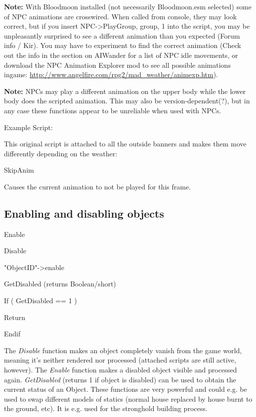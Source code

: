 \textbf{Note:} With Bloodmoon installed (not necessarily Bloodmoon.esm
selected) some of NPC animations are crosswired. When called from
console, they may look correct, but if you insert
NPC-\textgreater PlayGroup, group, 1 into the script, you may be
unpleasantly surprised to see a different animation than you expected
(Forum info / Kir). You may have to experiment to find the correct
animation (Check out the info in the section on AIWander for a list of
NPC idle movements, or download the NPC Animation Explorer mod to see
all possible animations ingame:
\url{http://www.angelfire.com/rpg2/mad_weather/animexp.htm}).

\textbf{Note:} NPCs may play a different animation on the upper body
while the lower body does the scripted animation. This may also be
version-dependent(?), but in any case these functions appear to be
unreliable when used with NPCs.

Example Script:

This original script is attached to all the outside banners and makes
them move differently depending on the weather:



SkipAnim

Causes the current animation to not be played for this frame.

\hypertarget{enabling-and-disabling-objects}{%
\subsection{Enabling and disabling
objects}\label{enabling-and-disabling-objects}}

Enable

Disable

"ObjectID"-\textgreater enable

GetDisabled (returns Boolean/short)

If ( GetDisabled == 1 )

Return

Endif

The \emph{Disable} function makes an object completely vanish from the
game world, meaning it's neither rendered nor processed (attached
scripts are still active, however). The \emph{Enable} function makes a
disabled object visible and processed again. \emph{GetDisabled} (returns
1 if object is disabled) can be used to obtain the current status of an
Object. These functions are very powerful and could e.g. be used to swap
different models of statics (normal house replaced by house burnt to the
ground, etc). It is e.g. used for the stronghold building process.

